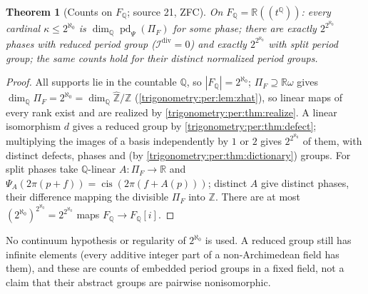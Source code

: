 \documentclass[11pt,letterpaper]{article}
\numberwithin{equation}{section}
\newtheorem{theorem}{Theorem}[section]
\theoremstyle{definition}
\theoremstyle{remark}
\newcommand{\R}{\mathbb R}
\newcommand{\Q}{\mathbb Q}
\newcommand{\Z}{\mathbb Z}
\newcommand{\cis}{\operatorname{cis}}
\newcommand{\pd}{\operatorname{pd}}
\newcommand{\Zhat}{\widehat{\Z}}
\newcommand{\cI}{\mathcal I}
\begin{document}
\begin{theorem}[Counts on $F_{\Q}$; source 21, ZFC]\label{trigonometry:per:thm:cardinality}
On $F_{\Q}=\R((t^{\Q}))$: every cardinal $\kappa\le2^{\aleph_0}$ is $\dim_{\Q}\pd_\Psi(\Pi_F)$ for some
phase; there are exactly $2^{2^{\aleph_0}}$ phases with \emph{reduced} period group
($\cI^{\mathrm{div}}=0$) and exactly $2^{2^{\aleph_0}}$ with split period group; the same counts hold
for their distinct normalized period groups.
\end{theorem}
\begin{proof}
All supports lie in the countable $\Q$, so $|F_{\Q}|=2^{\aleph_0}$; $\Pi_F\supseteq\R\omega$ gives
$\dim_{\Q}\Pi_F=2^{\aleph_0}=\dim_{\Q}\Zhat/\Z$ (\cref{trigonometry:per:lem:zhat}), so linear maps
of every rank exist and are realized by \cref{trigonometry:per:thm:realize}. A linear isomorphism
$d$ gives a reduced group by \cref{trigonometry:per:thm:defect}; multiplying the images of a basis
independently by $1$ or $2$ gives $2^{2^{\aleph_0}}$ of them, with distinct defects, phases and (by
\cref{trigonometry:per:thm:dictionary}) groups. For split phases take $\Q$-linear $A:\Pi_F\to\R$ and
$\Psi_A(2\pi(p+f))=\cis(2\pi(f+A(p)))$; distinct $A$ give distinct phases, their difference mapping the
divisible $\Pi_F$ into $\Z$. There are at most $(2^{\aleph_0})^{2^{\aleph_0}}=2^{2^{\aleph_0}}$ maps
$F_{\Q}\to F_{\Q}[i]$.
\end{proof}
No continuum hypothesis or regularity of $2^{\aleph_0}$ is used. A reduced group still has infinite
elements (every additive integer part of a non-Archimedean field has them), and these are counts of
embedded period groups in a fixed field, not a claim that their abstract groups are pairwise
nonisomorphic.
\end{document}

